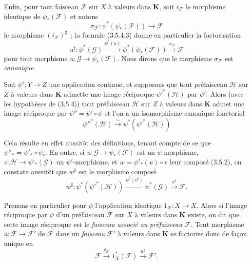 \begin{env}[3.5.4]
Enfin, pour tout faisceau $\mathcal{F}$ sur $X$ à valeurs dans
$\boldsymbol{K}$, soit $i_{\mathcal{F}}$ le morphisme identique de
$\psi_*(\mathcal{F})$ et notons
\[
  \sigma_{\mathcal{F}}:
  \psi^*(\psi_*(\mathcal{F}))\to\mathcal{F}
\]
le morphisme $(i_{\mathcal{F}})^\sharp$~; la formule (3.5.4.3) donne en
particulier la factorisation
\begin{equation*}
  u^\sharp:\psi^*(\mathcal{G})
  \xrightarrow{\psi^*(u)}
  \psi^*(\psi_*(\mathcal{F}))
  \xrightarrow{\sigma_{\mathcal{F}}}\mathcal{F}
\tag{3.5.4.4}\label{0.3.5.4.4-fr}
\end{equation*}
pour tout morphisme $u:\mathcal{G}\to\psi_*(\mathcal{F})$. Nous dirons que le
morphisme $\sigma_{\mathcal{F}}$ est \emph{canonique}.
\end{env}

\begin{env}[3.5.5]
\label{0.3.5.5-fr}
Soit $\psi':Y\to Z$ une application continue, et supposons que tout
préfaisceau $\mathcal{H}$ sur $Z$ à valeurs dans $\boldsymbol{K}$ admette une
image réciproque $\psi'^*(\mathcal{H})$ par $\psi'$. Alors (avec les
hypothèses de (3.5.4)) tout préfaisceau $\mathcal{H}$ sur $Z$ à valeurs dans
$\boldsymbol{K}$ admet une image réciproque par $\psi''=\psi'\circ\psi$ et l'on a
un isomorphisme canonique fonctoriel
\begin{equation*}
  \psi''^*(\mathcal{H})\xrightarrow{\sim}
  \psi^*(\psi'^*(\mathcal{H}))
\tag{3.5.5.1}\label{0.3.5.5.1-fr}
\end{equation*}


Cela résulte en effet aussitôt des définitions, tenant compte de ce que
$\psi''_*=\psi'_*\circ\psi_*$. En outre, si
$u:\mathcal{G}\to\psi_*(\mathcal{F})$ est un $\psi$-morphisme,
$v:\mathcal{H}\to\psi'_*(\mathcal{G})$ un $\psi'$-morphisme, et
$w=\psi'_*(u)\circ v$ leur composé (3.5.2), on constate aussitôt que
$w^\sharp$ est le morphisme composé
\[
  w^\sharp:\psi^*(\psi'^*(\mathcal{H}))
  \xrightarrow{\psi^*(v^\sharp)}
  \psi^*(\mathcal{G})
  \xrightarrow{u^\sharp}\mathcal{F}.
\]
\end{env}

\begin{env}[3.5.6]
\label{0.3.5.6-fr}
Prenons en particulier pour $\psi$ l'application identique
$1_X:X\to X$. Alors si l'image réciproque par $\psi$ d'un préfaisceau
$\mathcal{F}$ sur $X$ à valeurs dans $\boldsymbol{K}$ existe, on dit que cette
image réciproque est le \emph{faisceau associé au préfaisceau $\mathcal{F}$}.
Tout morphisme $u:\mathcal{F}\to\mathcal{F}'$ de $\mathcal{F}$ dans un
\emph{faisceau} $\mathcal{F}'$ à valeurs dans $\boldsymbol{K}$ se factorise donc
de façon unique en
\[
  \mathcal{F}\xrightarrow{\rho_{\mathcal{F}}}
  1_X^*(\mathcal{F})\xrightarrow{u^\sharp}\mathcal{F}'.
\]
\end{env}

